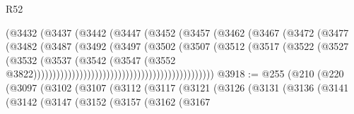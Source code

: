 \begin{lexlean}{R52}
\begin{coremodule}
                                                (@3432
                                                  (@3437
                                                    (@3442
                                                      (@3447
                                                        (@3452
                                                          (@3457
                                                            (@3462
                                                              (@3467
                                                                (@3472
                                                                  (@3477
                                                                    (@3482
                                                                      (@3487
                                                                        (@3492
                                                                          (@3497
                                                                            (@3502
                                                                              (@3507
                                                                                (@3512
                                                                                  (@3517
                                                                                    (@3522
                                                                                      (@3527
                                                                                        (@3532
                                                                                          (@3537
                                                                                            (@3542
                                                                                              (@3547
                                                                                                (@3552
                                                                                                  @3822)))))))))))))))))))))))))))))))))))))))))))))))
@3918 := @255
    (@210
      (@220
        (@3097
          (@3102
            (@3107
              (@3112
                (@3117
                  (@3121
                    (@3126
                      (@3131
                        (@3136
                          (@3141
                            (@3142
                              (@3147
                                (@3152
                                  (@3157
                                    (@3162
                                      (@3167

\end{coremodule}
\end{lexlean}

